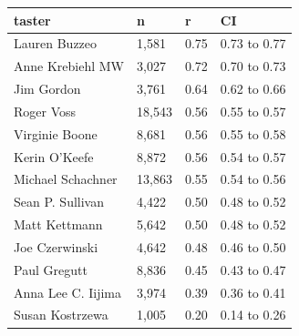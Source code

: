 \begin{tabular}{llll}
\toprule
\textbf{taster} & \textbf{n} & \textbf{r} & \textbf{CI} \\
\midrule
Lauren Buzzeo & 1,581 & 0.75 & 0.73 to 0.77 \\
Anne Krebiehl MW & 3,027 & 0.72 & 0.70 to 0.73 \\
Jim Gordon & 3,761 & 0.64 & 0.62 to 0.66 \\
Roger Voss & 18,543 & 0.56 & 0.55 to 0.57 \\
Virginie Boone & 8,681 & 0.56 & 0.55 to 0.58 \\
Kerin O’Keefe & 8,872 & 0.56 & 0.54 to 0.57 \\
Michael Schachner & 13,863 & 0.55 & 0.54 to 0.56 \\
Sean P. Sullivan & 4,422 & 0.50 & 0.48 to 0.52 \\
Matt Kettmann & 5,642 & 0.50 & 0.48 to 0.52 \\
Joe Czerwinski & 4,642 & 0.48 & 0.46 to 0.50 \\
Paul Gregutt & 8,836 & 0.45 & 0.43 to 0.47 \\
Anna Lee C. Iijima & 3,974 & 0.39 & 0.36 to 0.41 \\
Susan Kostrzewa & 1,005 & 0.20 & 0.14 to 0.26 \\
\bottomrule
\end{tabular}
